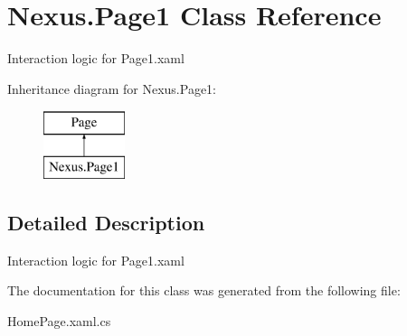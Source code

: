 \hypertarget{class_nexus_1_1_page1}{}\section{Nexus.\+Page1 Class Reference}
\label{class_nexus_1_1_page1}


Interaction logic for Page1.\+xaml  


Inheritance diagram for Nexus.\+Page1\+:\begin{figure}[H]
\begin{center}
\leavevmode
\includegraphics[height=2.000000cm]{class_nexus_1_1_page1}
\end{center}
\end{figure}


\subsection{Detailed Description}
Interaction logic for Page1.\+xaml 



The documentation for this class was generated from the following file\+:\begin{DoxyCompactItemize}
\item 
Home\+Page.\+xaml.\+cs\end{DoxyCompactItemize}
